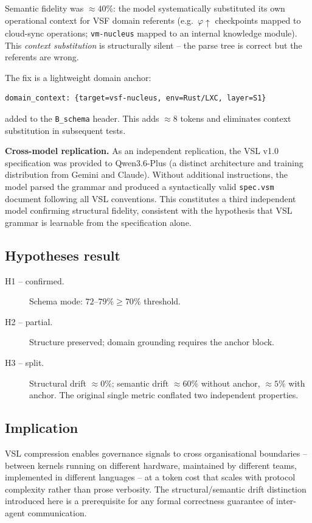 Semantic fidelity was $\approx 40\%$: the model systematically substituted
its own operational context for VSF domain referents
(e.g.\ $\varphi\!\uparrow$ checkpoints mapped to cloud-sync operations;
\texttt{vm-nucleus} mapped to an internal knowledge module).
This \emph{context substitution} is structurally silent -- the parse tree
is correct but the referents are wrong.

The fix is a lightweight domain anchor:

\begin{verbatim}
domain_context: {target=vsf-nucleus, env=Rust/LXC, layer=S1}
\end{verbatim}

\noindent added to the \texttt{B\_schema} header.
This adds $\approx 8$ tokens and eliminates context substitution in
subsequent tests.

\textbf{Cross-model replication.}
As an independent replication, the VSL v1.0 specification was provided to
Qwen3.6-Plus (a distinct architecture and training distribution from Gemini
and Claude).
Without additional instructions, the model parsed the grammar and produced
a syntactically valid \texttt{spec.vsm} document following all VSL
conventions.
This constitutes a third independent model confirming structural fidelity,
consistent with the hypothesis that VSL grammar is learnable from the
specification alone.

\subsection{Hypotheses result}

\begin{description}
  \item[H1 -- confirmed.]  Schema mode: $72$--$79\% \geq 70\%$ threshold.
  \item[H2 -- partial.]    Structure preserved; domain grounding requires
        the anchor block.
  \item[H3 -- split.]      Structural drift $\approx 0\%$;
        semantic drift $\approx 60\%$ without anchor, $\approx 5\%$ with
        anchor.  The original single metric conflated two independent
        properties.
\end{description}

\subsection{Implication}

VSL compression enables governance signals to cross organisational
boundaries -- between kernels running on different hardware, maintained
by different teams, implemented in different languages -- at a token cost
that scales with protocol complexity rather than prose verbosity.
The structural/semantic drift distinction introduced here is a prerequisite
for any formal correctness guarantee of inter-agent communication.
